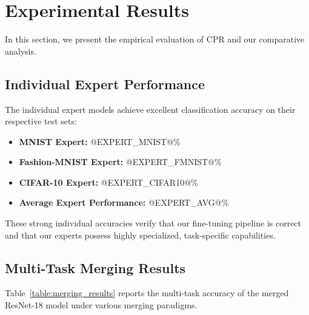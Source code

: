 \documentclass{article}
\theoremstyle{plain}
\theoremstyle{definition}
\theoremstyle{remark}
\begin{document}
\section{Experimental Results}
\label{sec:results}

In this section, we present the empirical evaluation of CPR and our comparative analysis.

\subsection{Individual Expert Performance}
The individual expert models achieve excellent classification accuracy on their respective test sets:
\begin{itemize}
\item \textbf{MNIST Expert:} @EXPERT_MNIST@\%
\item \textbf{Fashion-MNIST Expert:} @EXPERT_FMNIST@\%
\item \textbf{CIFAR-10 Expert:} @EXPERT_CIFAR10@\%
\item \textbf{Average Expert Performance:} @EXPERT_AVG@\%
\end{itemize}

These strong individual accuracies verify that our fine-tuning pipeline is correct and that our experts possess highly specialized, task-specific capabilities.

\subsection{Multi-Task Merging Results}
Table~\ref{table:merging_results} reports the multi-task accuracy of the merged ResNet-18 model under various merging paradigms.
\end{document}
